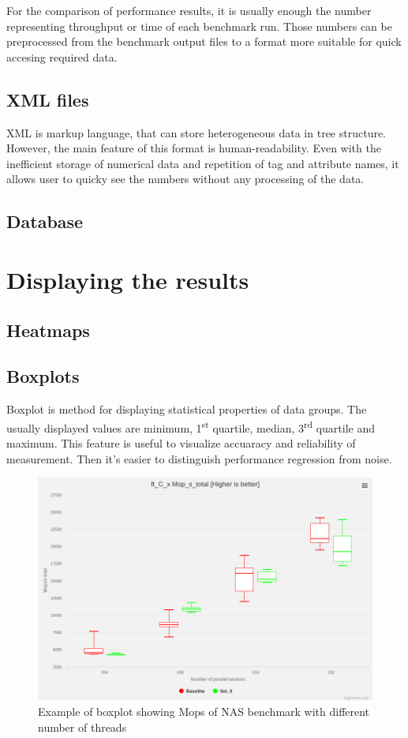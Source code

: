 For the comparison of performance results, it is usually enough the number
representing throughput or time of each benchmark run. Those numbers can be
preprocessed from the benchmark output files to a format more suitable for quick
accesing required data.

\section{XML files}
XML is markup language, that can store heterogeneous data in tree structure.
However, the main feature of this format is human-readability. Even with the
inefficient storage of numerical data and repetition of tag and attribute names,
it allows user to quicky see the numbers without any processing of the data.

\section{Database}


\chapter{Displaying the results}

\section{Heatmaps}

\section{Boxplots}
Boxplot is method for displaying statistical properties of data groups. The
usually displayed values are minimum, 1\textsuperscript{st} quartile, median,
3\textsuperscript{rd} quartile and maximum.
This feature is useful to visualize accuaracy and reliability of measurement.
Then it's easier to distinguish performance regression from noise.

\begin{figure}
  \centering
  \includegraphics[width=12cm]{obrazky-figures/boxplot}
  \caption{Example of boxplot showing Mops of NAS benchmark with different
    number of threads}
\end{figure}


